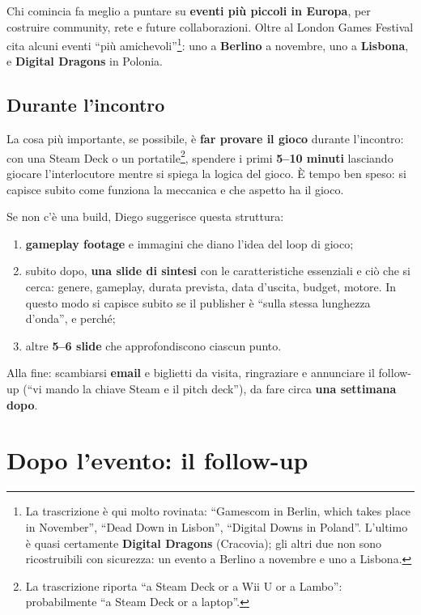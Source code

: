 Chi comincia fa meglio a puntare su \textbf{eventi più piccoli in Europa}, per
costruire community, rete e future collaborazioni. Oltre al London Games Festival
cita alcuni eventi ``più amichevoli''\footnote{La trascrizione è qui molto
rovinata: ``Gamescom in Berlin, which takes place in November'', ``Dead Down in
Lisbon'', ``Digital Downs in Poland''. L'ultimo è quasi certamente
\textbf{Digital Dragons} (Cracovia); gli altri due non sono ricostruibili con
sicurezza: un evento a Berlino a novembre e uno a Lisbona.}: uno a
\textbf{Berlino} a novembre, uno a \textbf{Lisbona}, e \textbf{Digital Dragons} in
Polonia.

\subsection{Durante l'incontro}

La cosa più importante, se possibile, è \textbf{far provare il gioco} durante
l'incontro: con una Steam Deck o un portatile\footnote{La trascrizione riporta
``a Steam Deck or a Wii U or a Lambo'': probabilmente ``a Steam Deck or a laptop''.},
spendere i primi \textbf{5--10 minuti} lasciando giocare l'interlocutore mentre si
spiega la logica del gioco. È tempo ben speso: si capisce subito come funziona la
meccanica e che aspetto ha il gioco.

Se non c'è una build, Diego suggerisce questa struttura:
\begin{enumerate}
  \item \textbf{gameplay footage} e immagini che diano l'idea del loop di gioco;
  \item subito dopo, \textbf{una slide di sintesi} con le caratteristiche
        essenziali e ciò che si cerca: genere, gameplay, durata prevista, data
        d'uscita, budget, motore. In questo modo si capisce subito se il publisher
        è ``sulla stessa lunghezza d'onda'', e perché;
  \item altre \textbf{5--6 slide} che approfondiscono ciascun punto.
\end{enumerate}
Alla fine: scambiarsi \textbf{email} e biglietti da visita, ringraziare e
annunciare il follow-up (``vi mando la chiave Steam e il pitch deck''), da fare
circa \textbf{una settimana dopo}.

\section{Dopo l'evento: il follow-up}
\label{sec:c3-1-dopo}

